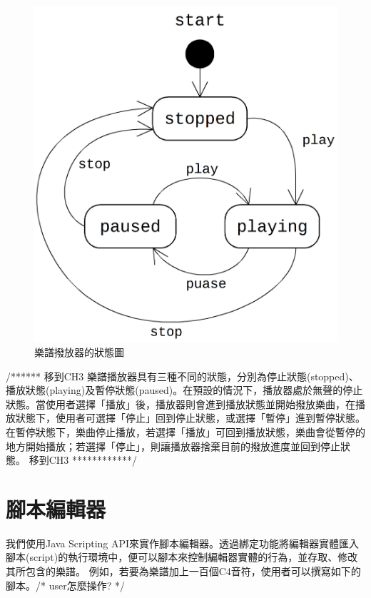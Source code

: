 \documentclass[12pt,a4paper,oneside]{report}
\begin{document}
\begin{figure}[htb]
\centering
\includegraphics[scale=0.15]{img/player_states.png}
\caption{ 樂譜撥放器的狀態圖 }
\label{fig:player_states}
\end{figure}



/****** 移到CH3  
樂譜播放器具有三種不同的狀態，分別為停止狀態(stopped)、播放狀態(playing)及暫停狀態(paused)。在預設的情況下，播放器處於無聲的停止狀態。當使用者選擇「播放」後，播放器則會進到播放狀態並開始撥放樂曲，在播放狀態下，使用者可選擇「停止」回到停止狀態，或選擇「暫停」進到暫停狀態。在暫停狀態下，樂曲停止播放，若選擇「播放」可回到播放狀態，樂曲會從暫停的地方開始播放；若選擇「停止」，則讓播放器捨棄目前的撥放進度並回到停止狀態。
 移到CH3  ************/  


\section{腳本編輯器}

我們使用Java Scripting API來實作腳本編輯器。透過綁定功能將編輯器實體匯入腳本(script)的執行環境中，便可以腳本來控制編輯器實體的行為，並存取、修改其所包含的樂譜。
例如，若要為樂譜加上一百個C4音符，使用者可以撰寫如下的腳本。/* user怎麼操作? */
\end{document}
